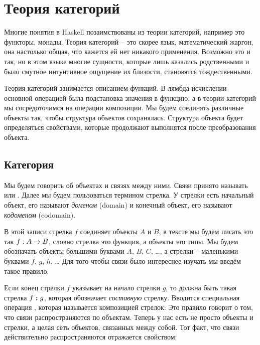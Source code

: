 \setcounter{chapter}{14}
\chapter{Теория категорий}

Многие понятия в Haskell позаимствованы из теории
категорий, например это функторы, монады. Теория категорий --
это скорее язык, математический жаргон, она настолько общая,
что кажется ей нет никакого применения. Возможно это
и так, но в этом языке многие сущности, которые лишь
казались родственными и было смутное интуитивное ощущение
их близости, становятся тождественными.

Теория категорий занимается описанием функций. 
В лямбда-исчислении основной операцией была подстановка
значения в функцию, а в теории категорий мы сосредоточимся
на операции композиции. Мы будем соединять различные объекты
так, чтобы структура объектов сохранялась. Структура 
объекта будет определяться свойствами, которые продолжают 
выполнятся после преобразования объекта.


\section{Категория}

Мы будем говорить об объектах и связях между ними. 
Связи принято называть  или 
. Далее мы будем пользоваться 
термином стрелка. У стрелки есть начальный объект,
его называют \emph{доменом} (domain) и конечный объект,
его называют \emph{кодоменом} (codomain). 


В этой записи стрелка $f$ соединяет объекты $A$ и $B$,
в тексте мы будем писать это так $f:A \rightarrow B$, словно
стрелка это функция, а объекты это типы.
Мы будем обозначать объекты большими буквами $A$, $B$, $C$, \dots,
а стрелки -- маленькими буквами $f$, $g$, $h$, \dots
Для того чтобы связи было интереснее изучать мы введём такое 
правило:


Если конец стрелки $f$ указывает на начало стрелки $g$, 
то должна быть такая стрелка $f \footnotesize\textbf{~;~}\normalsize g$, которая обозначает
\emph{составную} стрелку. Вводится специальная 
операция , 
которая называется композицией стрелок:
Это правило говорит о 
том, что связи распространяются по объектам.
Теперь у нас есть не просто объекты и стрелки, а целая сеть
объектов, связанных между собой. Тот факт, что связи действительно
распространяются отражается свойством:


